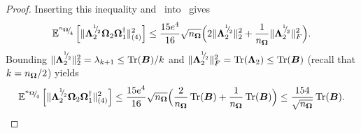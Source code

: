 \begin{proof}
    Inserting this inequality and~ into~ gives
    \begin{equation*}
        \mathbb{E}^{{}^{n_{\boldsymbol{\Omega}}}{\mskip -5mu/\mskip -3mu}_{4}}\left[ \lVert \boldsymbol{\Lambda}_2^{{}^{1}{\mskip -5mu/\mskip -3mu}_{2}} \boldsymbol{\Omega}_2 \boldsymbol{\Omega}_1^{\dagger} \rVert _{(4)}^2 \right]
        \leq \frac{15 e^4}{16}  \sqrt{n_{\boldsymbol{\Omega}}} \Big( 2 \lVert \boldsymbol{\Lambda}_2^{{}^{1}{\mskip -5mu/\mskip -3mu}_{2}} \rVert _2^2 + \frac{1}{n_{\boldsymbol{\Omega}}} \lVert \boldsymbol{\Lambda}_2^{{}^{1}{\mskip -5mu/\mskip -3mu}_{2}} \rVert _F^2 \Big).
    \end{equation*}
    Bounding $\lVert \boldsymbol{\Lambda}_2^{{}^{1}{\mskip -5mu/\mskip -3mu}_{2}} \rVert _2^2 = \lambda_{k+1}  \leq \operatorname{Tr}(\boldsymbol{B})/k$ and $\lVert \boldsymbol{\Lambda}_2^{{}^{1}{\mskip -5mu/\mskip -3mu}_{2}} \rVert _F^2 = \operatorname{Tr}(\boldsymbol{\Lambda}_2) \le \operatorname{Tr}(\boldsymbol{B})$ (recall that $k = n_{\boldsymbol{\Omega}}/2$) yields
    \begin{equation}
        \mathbb{E}^{{}^{n_{\boldsymbol{\Omega}}}{\mskip -5mu/\mskip -3mu}_{4}}\left[ \lVert \boldsymbol{\Lambda}_2^{{}^{1}{\mskip -5mu/\mskip -3mu}_{2}} \boldsymbol{\Omega}_2 \boldsymbol{\Omega}_1^{\dagger} \rVert _{(4)}^2 \right]
        \leq \frac{15 e^4}{16}  \sqrt{n_{\boldsymbol{\Omega}}} \Big( \frac{2}{n_{\boldsymbol{\Omega}}} \operatorname{Tr}(\boldsymbol{B}) + \frac{1}{n_{\boldsymbol{\Omega}}} \operatorname{Tr}(\boldsymbol{B}) \Big)
        \leq  \frac{154}{\sqrt{n_{\boldsymbol{\Omega}}}} \operatorname{Tr}(\boldsymbol{B}).
        \label{equ:nystrom-proof-tail-bound}
    \end{equation}
    

\end{proof}
